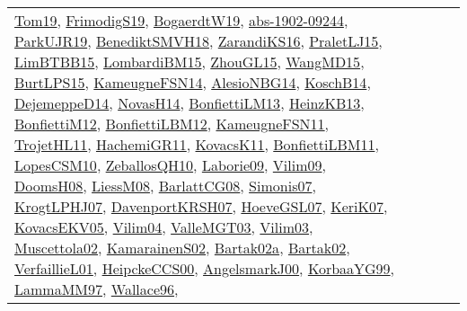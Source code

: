 {\begin{longtable}{lp{3cm}>{\raggedright}p{6cm}>{\raggedright}p{6cm}p{8cm}}
\href{papers/Tom19.pdf}{Tom19}\cite{Tom19}, \href{papers/FrimodigS19.pdf}{FrimodigS19}\cite{FrimodigS19}, \href{papers/BogaerdtW19.pdf}{BogaerdtW19}\cite{BogaerdtW19}, \href{articles/abs-1902-09244.pdf}{abs-1902-09244}\cite{abs-1902-09244}, \href{papers/ParkUJR19.pdf}{ParkUJR19}\cite{ParkUJR19}, \href{papers/BenediktSMVH18.pdf}{BenediktSMVH18}\cite{BenediktSMVH18}, \href{articles/ZarandiKS16.pdf}{ZarandiKS16}\cite{ZarandiKS16}, \href{papers/PraletLJ15.pdf}{PraletLJ15}\cite{PraletLJ15}, \href{papers/LimBTBB15.pdf}{LimBTBB15}\cite{LimBTBB15}, \href{papers/LombardiBM15.pdf}{LombardiBM15}\cite{LombardiBM15}, \href{papers/ZhouGL15.pdf}{ZhouGL15}\cite{ZhouGL15}, \href{articles/WangMD15.pdf}{WangMD15}\cite{WangMD15}, \href{papers/BurtLPS15.pdf}{BurtLPS15}\cite{BurtLPS15}, \href{articles/KameugneFSN14.pdf}{KameugneFSN14}\cite{KameugneFSN14}, \href{papers/AlesioNBG14.pdf}{AlesioNBG14}\cite{AlesioNBG14}, \href{papers/KoschB14.pdf}{KoschB14}\cite{KoschB14}, \href{papers/DejemeppeD14.pdf}{DejemeppeD14}\cite{DejemeppeD14}, \href{articles/NovasH14.pdf}{NovasH14}\cite{NovasH14}, \href{papers/BonfiettiLM13.pdf}{BonfiettiLM13}\cite{BonfiettiLM13}, \href{papers/HeinzKB13.pdf}{HeinzKB13}\cite{HeinzKB13}, \href{papers/BonfiettiM12.pdf}{BonfiettiM12}\cite{BonfiettiM12}, \href{papers/BonfiettiLBM12.pdf}{BonfiettiLBM12}\cite{BonfiettiLBM12}, \href{papers/KameugneFSN11.pdf}{KameugneFSN11}\cite{KameugneFSN11}, \href{articles/TrojetHL11.pdf}{TrojetHL11}\cite{TrojetHL11}, \href{articles/HachemiGR11.pdf}{HachemiGR11}\cite{HachemiGR11}, \href{articles/KovacsK11.pdf}{KovacsK11}\cite{KovacsK11}, \href{papers/BonfiettiLBM11.pdf}{BonfiettiLBM11}\cite{BonfiettiLBM11}, \href{articles/LopesCSM10.pdf}{LopesCSM10}\cite{LopesCSM10}, \href{articles/ZeballosQH10.pdf}{ZeballosQH10}\cite{ZeballosQH10}, \href{papers/Laborie09.pdf}{Laborie09}\cite{Laborie09}, \href{papers/Vilim09.pdf}{Vilim09}\cite{Vilim09}, \href{papers/DoomsH08.pdf}{DoomsH08}\cite{DoomsH08}, \href{articles/LiessM08.pdf}{LiessM08}\cite{LiessM08}, \href{papers/BarlattCG08.pdf}{BarlattCG08}\cite{BarlattCG08}, \href{articles/Simonis07.pdf}{Simonis07}\cite{Simonis07}, \href{papers/KrogtLPHJ07.pdf}{KrogtLPHJ07}\cite{KrogtLPHJ07}, \href{papers/DavenportKRSH07.pdf}{DavenportKRSH07}\cite{DavenportKRSH07}, \href{papers/HoeveGSL07.pdf}{HoeveGSL07}\cite{HoeveGSL07}, \href{papers/KeriK07.pdf}{KeriK07}\cite{KeriK07}, \href{papers/KovacsEKV05.pdf}{KovacsEKV05}\cite{KovacsEKV05}, \href{papers/Vilim04.pdf}{Vilim04}\cite{Vilim04}, \href{papers/ValleMGT03.pdf}{ValleMGT03}\cite{ValleMGT03}, \href{papers/Vilim03.pdf}{Vilim03}\cite{Vilim03}, \href{papers/Muscettola02.pdf}{Muscettola02}\cite{Muscettola02}, \href{papers/KamarainenS02.pdf}{KamarainenS02}\cite{KamarainenS02}, \href{papers/Bartak02a.pdf}{Bartak02a}\cite{Bartak02a}, \href{papers/Bartak02.pdf}{Bartak02}\cite{Bartak02}, \href{papers/VerfaillieL01.pdf}{VerfaillieL01}\cite{VerfaillieL01}, \href{articles/HeipckeCCS00.pdf}{HeipckeCCS00}\cite{HeipckeCCS00}, \href{papers/AngelsmarkJ00.pdf}{AngelsmarkJ00}\cite{AngelsmarkJ00}, \href{papers/KorbaaYG99.pdf}{KorbaaYG99}\cite{KorbaaYG99}, \href{articles/LammaMM97.pdf}{LammaMM97}\cite{LammaMM97}, \href{articles/Wallace96.pdf}{Wallace96}\cite{Wallace96}, 
\end{longtable}}
